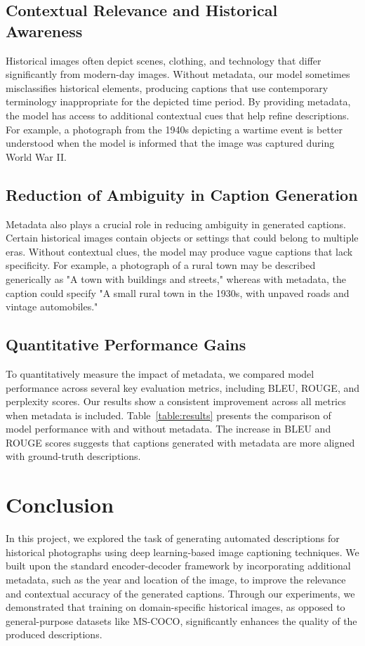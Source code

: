 \documentclass[10pt,twocolumn,letterpaper]{article}
\begin{document}
\subsection{Contextual Relevance and Historical Awareness}
Historical images often depict scenes, clothing, and technology that differ significantly from modern-day images. Without metadata, our model sometimes misclassifies historical elements, producing captions that use contemporary terminology inappropriate for the depicted time period. By providing metadata, the model has access to additional contextual cues that help refine descriptions. For example, a photograph from the 1940s depicting a wartime event is better understood when the model is informed that the image was captured during World War II.

\subsection{Reduction of Ambiguity in Caption Generation}
Metadata also plays a crucial role in reducing ambiguity in generated captions. Certain historical images contain objects or settings that could belong to multiple eras. Without contextual clues, the model may produce vague captions that lack specificity. For example, a photograph of a rural town may be described generically as "A town with buildings and streets," whereas with metadata, the caption could specify "A small rural town in the 1930s, with unpaved roads and vintage automobiles."

\subsection{Quantitative Performance Gains}
To quantitatively measure the impact of metadata, we compared model performance across several key evaluation metrics, including BLEU, ROUGE, and perplexity scores. Our results show a consistent improvement across all metrics when metadata is included. Table~\ref{table:results} presents the comparison of model performance with and without metadata. The increase in BLEU and ROUGE scores suggests that captions generated with metadata are more aligned with ground-truth descriptions.


\section{Conclusion}

In this project, we explored the task of generating automated descriptions for historical photographs using deep learning-based image captioning techniques. We built upon the standard encoder-decoder framework by incorporating additional metadata, such as the year and location of the image, to improve the relevance and contextual accuracy of the generated captions. Through our experiments, we demonstrated that training on domain-specific historical images, as opposed to general-purpose datasets like MS-COCO, significantly enhances the quality of the produced descriptions.
\end{document}
